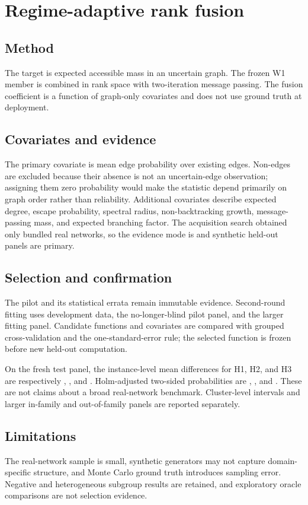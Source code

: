 \documentclass{article}
\begin{document}
\section*{Regime-adaptive rank fusion}
\subsection*{Method}
The target is expected accessible mass in an uncertain graph. The frozen W1
member is combined in rank space with two-iteration message passing. The
fusion coefficient is a function of graph-only covariates and does not use
ground truth at deployment.

\subsection*{Covariates and evidence}
The primary covariate is mean edge probability over existing edges. Non-edges
are excluded because their absence is not an uncertain-edge observation;
assigning them zero probability would make the statistic depend primarily on
graph order rather than reliability. Additional covariates describe expected
degree, escape probability, spectral radius, non-backtracking growth,
message-passing mass, and expected branching factor. The acquisition search
obtained only \FusionRealNetworkCount{} bundled real networks, so the evidence
mode is \FusionEvidenceMode{} and synthetic held-out panels are primary.

\subsection*{Selection and confirmation}
The pilot and its statistical errata remain immutable evidence. Second-round
fitting uses development data, the no-longer-blind pilot panel, and the larger
fitting panel. Candidate functions and covariates are compared with grouped
cross-validation and the one-standard-error rule; the selected function is
frozen before new held-out computation.

On the fresh test panel, the instance-level mean differences for H1, H2, and
H3 are respectively \FusionHOneMean{}, \FusionHTwoMean{}, and
\FusionHThreeMean{}. Holm-adjusted two-sided probabilities are
\FusionHOneP{}, \FusionHTwoP{}, and \FusionHThreeP{}. These are not claims
about a broad real-network benchmark. Cluster-level intervals and larger
in-family and out-of-family panels are reported separately.

\subsection*{Limitations}
The real-network sample is small, synthetic generators may not capture
domain-specific structure, and Monte Carlo ground truth introduces sampling
error. Negative and heterogeneous subgroup results are retained, and
exploratory oracle comparisons are not selection evidence.
\end{document}
